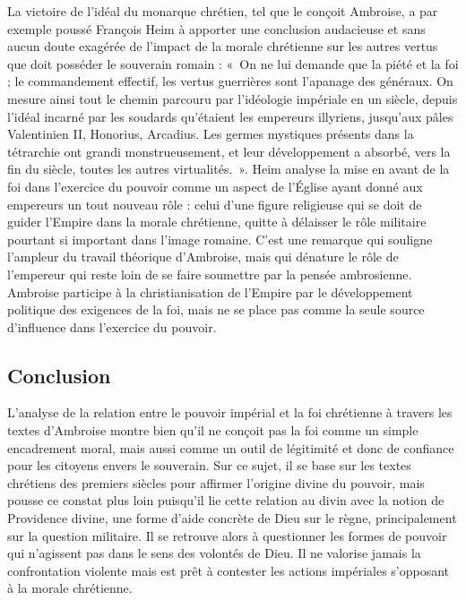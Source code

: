 La victoire de l'idéal du monarque chrétien, tel que le conçoit Ambroise, a par exemple poussé François Heim à apporter une conclusion audacieuse et sans aucun doute exagérée de l'impact de la morale chrétienne sur les autres vertus que doit posséder le souverain romain : «~On ne lui demande que la piété et la foi ; le commandement effectif, les vertus guerrières sont l’apanage des généraux. On mesure ainsi tout le chemin parcouru par l’idéologie impériale en un siècle, depuis l’idéal incarné par les soudards qu’étaient les empereurs illyriens, jusqu’aux pâles Valentinien II, Honorius, Arcadius. Les germes mystiques présents dans la tétrarchie ont grandi monstrueusement, et leur développement a absorbé, vers la fin du siècle, toutes les autres virtualités.\autocite[165]{heim_victoire}~». Heim analyse la mise en avant de la foi dans l'exercice du pouvoir comme un aspect de l'Église ayant donné aux empereurs un tout nouveau rôle : celui d'une figure religieuse qui se doit de guider l'Empire dans la morale chrétienne, quitte à délaisser le rôle militaire pourtant si important dans l'image romaine. C'est une remarque qui souligne l'ampleur du travail théorique d'Ambroise, mais qui dénature le rôle de l'empereur qui reste loin de se faire soumettre par la pensée ambrosienne. Ambroise participe à la christianisation de l'Empire par le développement politique des exigences de la foi, mais ne se place pas comme la seule source d'influence dans l'exercice du pouvoir.

\bigskip

\subsection*{Conclusion}

L'analyse de la relation entre le pouvoir impérial et la foi chrétienne à travers les textes d'Ambroise montre bien qu'il ne conçoit pas la foi comme un simple encadrement moral, mais aussi comme un outil de légitimité et donc de confiance pour les citoyens envers le souverain. Sur ce sujet, il se base sur les textes chrétiens des premiers siècles pour affirmer l'origine divine du pouvoir, mais pousse ce constat plus loin puisqu'il lie cette relation au divin avec la notion de Providence divine, une forme d'aide concrète de Dieu sur le règne, principalement sur la question militaire. Il se retrouve alors à questionner les formes de pouvoir qui n'agissent pas dans le sens des volontés de Dieu. Il ne valorise jamais la confrontation violente mais est prêt à contester les actions impériales s'opposant à la morale chrétienne.


